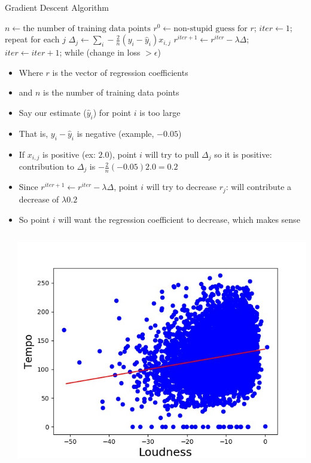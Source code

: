 \documentclass[aspectratio=169]{beamer}
\begin{document}
\begin{frame}[fragile]{Gradient Descent Algorithm}
\begin{SQL}
$n \leftarrow \textrm{the number of training data points}$
$r^0 \leftarrow \textrm{non-stupid guess for } r$;
$iter \leftarrow 1$;
repeat {
  for each $j$
    $\Delta_j \leftarrow \sum_i -\frac{2}{n}(y_i - \hat{y}_i) x_{i,j}$
  $r^{iter + 1} \leftarrow r^{iter} - \lambda \Delta$;
  $iter \leftarrow iter + 1$;
} while (change in loss $> \epsilon$)
\end{SQL}

\begin{itemize}
	\item Where $r$ is the vector of regression coefficients
	\item and $n$ is the number of training data points

	\item Say our estimate ($\hat{y}_i$) for point $i$ is too large
        \item That is, $y_i - \hat{y}_i$ is negative (example, $-0.05$)
        \item If $x_{i,j}$ is positive (ex: $2.0$), point $i$ will try to pull $\Delta_j$ so it is positive:
               contribution to $\Delta_j$ is $-\frac{2}{n}(-0.05)2.0 = 0.2$
        \item Since $r^{iter + 1} \leftarrow r^{iter} - \lambda \Delta$, point $i$ will try to decrease $r_j$:
               will contribute a decrease of $\lambda 0.2$
        \item So point $i$ will want the regression coefficient to decrease, which makes sense
\end{itemize}
\end{frame}
\begin{frame}{}
\begin{columns}
\begin{column}{0.5\textwidth}
    \end{column}
\begin{column}{0.5\textwidth}
     \includegraphics[width=1\textwidth]{lectLR/musicLoudTempo.jpg} 
\end{column}
 \end{columns}

\end{frame}
\end{document}
